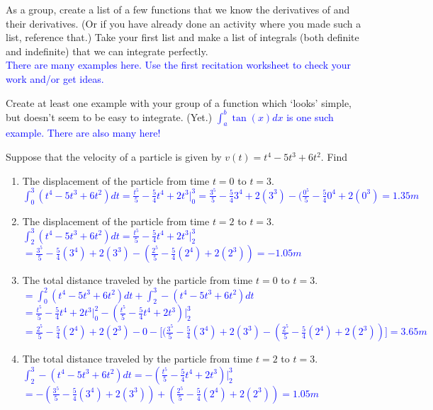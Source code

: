 \documentclass{ximera}
\begin{document}
\begin{exercise}
    As a group, create a list of a few functions that we know the derivatives of and their derivatives.  (Or if you have already done an activity where you made such a list, reference that.)  Take your first list and make a list of integrals (both definite and indefinite) that we can integrate perfectly.\\
    \textcolor{blue}{ There are many examples here. Use the first recitation worksheet to check your work and/or get ideas.}
\end{exercise}

\begin{exercise}
    Create at least one example with your group of a function which `looks' simple, but doesn't seem to be easy to integrate. (Yet.)
    \textcolor{blue}{ $\int_a^b \tan(x)dx$ is one such example. There are also many here! }

\end{exercise}

\begin{exercise}
    Suppose that the velocity of a particle is given by $v(t)=t^4-5t^3+6t^2$.  Find 
    \begin{enumerate}
        \item The displacement of the particle from time $t=0$ to $t=3$.\\
        \textcolor{blue}{ $\int_0^3 (t^4-5t^3+6t^2)dt=\frac{t^5}{5}-\frac{5}{4}t^4+2t^3\bigg|_{0}^{3}=\frac{3^5}{5}-\frac{5}{4}3^4+2(3^3)-(\frac{0^5}{5}-\frac{5}{4}0^4+2(0^3)=1.35 m$}
        
        \item The displacement of the particle from time $t=2$ to $t=3$.\\
        \textcolor{blue}{ $\int_2^3 (t^4-5t^3+6t^2)dt=\frac{t^5}{5}-\frac{5}{4}t^4+2t^3\bigg|_{2}^{3}$\\
        $=\frac{3^5}{5}-\frac{5}{4}(3^4)+2(3^3)-(\frac{2^5}{5}-\frac{5}{4}(2^4)+2(2^3))=-1.05 m$}
        
        \item The total distance traveled by the particle from time $t=0$ to $t=3$.\\
        \textcolor{blue}{ $=\int_0^2 (t^4-5t^3+6t^2)dt+\int_2^3-(t^4-5t^3+6t^2)dt$\\
        $=\frac{t^5}{5}-\frac{5}{4}t^4+2t^3\bigg|_{0}^{2}-(\frac{t^5}{5}-\frac{5}{4}t^4+2t^3)\bigg|_{2}^{3}$\\
        $=\frac{2^5}{5}-\frac{5}{4}(2^4)+2(2^3)-0-\bigg[(\frac{3^5}{5}-\frac{5}{4}(3^4)+2(3^3)-(\frac{2^5}{5}-\frac{5}{4}(2^4)+2(2^3))\bigg]=3.65m$\\}
        \item The total distance traveled by the particle from time $t=2$ to $t=3$.
        \textcolor{blue}{ $\int_2^3 -(t^4-5t^3+6t^2)dt=-(\frac{t^5}{5}-\frac{5}{4}t^4+2t^3)\bigg|_{2}^{3}$\\
        $=-(\frac{3^5}{5}-\frac{5}{4}(3^4)+2(3^3))+(\frac{2^5}{5}-\frac{5}{4}(2^4)+2(2^3))=1.05 m$}
    \end{enumerate}
\end{exercise}
\end{document}
